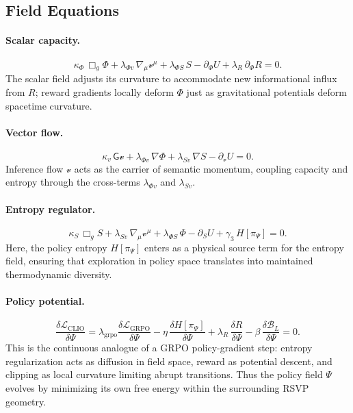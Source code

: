 \documentclass[11pt]{article}
\begin{document}
\subsection{Field Equations}

\paragraph{Scalar capacity.}
\[
\kappa_\Phi\,\Box_g\Phi
+\lambda_{\Phi v}\,\nabla_\mu\mathcal{v}^\mu
+\lambda_{\Phi S}\,S
-\partial_\Phi U
+\lambda_R\,\partial_\Phi R
=0.
\]
The scalar field adjusts its curvature to accommodate new informational influx from $R$; reward gradients locally deform $\Phi$ just as gravitational potentials deform spacetime curvature.

\paragraph{Vector flow.}
\[
\kappa_v\,\mathsf{G}\mathcal{v}
+\lambda_{\Phi v}\,\nabla\Phi
+\lambda_{Sv}\,\nabla S
-\partial_{\mathcal{v}}U
=0.
\]
Inference flow $\mathcal{v}$ acts as the carrier of semantic momentum, coupling capacity and entropy through the cross-terms $\lambda_{\Phi v}$ and $\lambda_{Sv}$.

\paragraph{Entropy regulator.}
\[
\kappa_S\,\Box_g S
+\lambda_{Sv}\,\nabla_\mu \mathcal{v}^\mu
+\lambda_{\Phi S}\,\Phi
-\partial_S U
+\gamma_3\,H[\pi_\Psi]
=0.
\]
Here, the policy entropy $H[\pi_\Psi]$ enters as a physical source term for the entropy field, ensuring that exploration in policy space translates into maintained thermodynamic diversity.

\paragraph{Policy potential.}
\[
\frac{\delta \mathcal{L}_{\mathrm{CLIO}}}{\delta\Psi}
=
\lambda_{\mathrm{grpo}}
\frac{\delta \mathcal{L}_{\mathrm{GRPO}}}{\delta\Psi}
-\eta\,\frac{\delta H[\pi_\Psi]}{\delta\Psi}
+\lambda_R\,\frac{\delta R}{\delta\Psi}
-\beta\,\frac{\delta \mathcal{B}_L}{\delta\Psi}
=0.
\]
This is the continuous analogue of a GRPO policy-gradient step:  
entropy regularization acts as diffusion in field space, reward as potential descent, and clipping as local curvature limiting abrupt transitions.  
Thus the policy field $\Psi$ evolves by minimizing its own free energy within the surrounding RSVP geometry.
\end{document}
